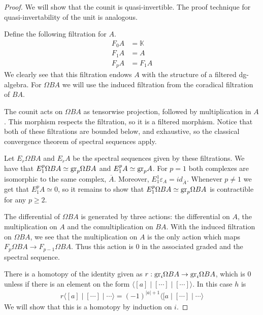 \documentclass[../thesis.tex]{subfiles}
\begin{document}
            \begin{proof}
                We will show that the counit is quasi-invertible. The proof technique for quasi-invertability of the unit is analogous.

                Define the following filtration for $A$.
                \begin{align*}
                    F_0A & = \mathbb{K} \\
                    F_1A & = A \\
                    F_pA & = F_1A 
                \end{align*}
                We clearly see that this filtration endows $A$ with the structure of a filtered dg-algebra. For $\Omega BA$ we will use the induced filtration from the coradical filtration of $BA$.

                The counit acts on $\Omega BA$ as tensorwise projection, followed by multiplication in $A$. This morphism respects the filtration, so it is a filtered morphism. Notice that both of these filtrations are bounded below, and exhaustive, so the classical convergence theorem of spectral sequences apply.

                Let $E_r\Omega BA$ and $E_rA$ be the spectral sequences given by these filtrations. We have that $E_1^{p}\Omega BA \simeq \tt{gr}_p \Omega BA$ and $E_1^{p}A \simeq \tt{gr}_pA$. For $p=1$ both complexes are isomorphic to the same complex, $\overline{A}$. Moreover, $E_1^{1}\varepsilon_A = id_{\overline{A}}$. Whenever $p\neq 1$ we get that $E_1^p A \simeq 0$, so it remains to show that $E_1^p \Omega BA \simeq \tt{gr}_p \Omega BA$ is contractible for any $p \geq 2$.

                The differential of $\Omega BA$ is generated by three actions: the differential on $A$, the multiplication on $A$ and the comultiplication on $BA$. With the induced filtration on $\Omega BA$, we see that the multiplication on $A$ is the only action which maps $F_p\Omega BA \rightarrow F_{p-1}\Omega BA$. Thus this action is $0$ in the associated graded and the spectral sequence. 

                There is a homotopy of the identity given as $r : \tt{gr}_i \Omega BA \rightarrow \tt{gr}_i \Omega BA$, which is $0$ unless if there is an element on the form $\langle [ a ] \mid [ \cdots ] \mid [ \cdots ] \rangle$. In this case $h$ is 
                \begin{align*}                    
                    r\langle [a] \mid [\cdots] \mid \cdots \rangle = (-1)^{|a|+1} \langle [a \mid [\cdots] \mid \cdots \rangle
                \end{align*}
                We will show that this is a homotopy by induction on $i$.


\end{proof}
\end{document}
